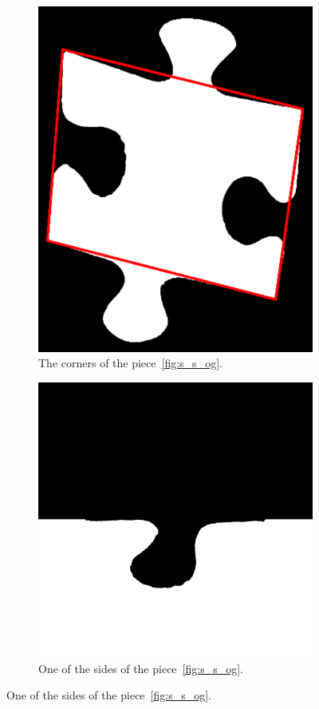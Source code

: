 \documentclass{article}
\begin{document}
\begin{figure}
\begin{subfigure}{0.3\textwidth}
    \includegraphics[width=\linewidth]{pictures/corners_found.png}
    \caption{The corners of the piece~\ref{fig:s_s_og}.}
    \label{fig:s_s_corners_found}
  \end{subfigure}
  \hfill
  \begin{subfigure}{0.3\textwidth}
    \centering
    \includegraphics[width=\linewidth]{pictures/piece_side.png}
    \caption{One of the sides of the piece~\ref{fig:s_s_og}.}
    \label{fig:s_s_a_piece_side}
  \end{subfigure}
  

\end{figure}
\end{document}
